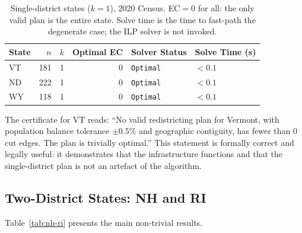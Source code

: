 \begin{table}[t]
\centering
\caption{%
  Single-district states ($k=1$), 2020 Census.
  EC$= 0$ for all: the only valid plan is the entire state.
  Solve time is the time to fast-path the degenerate case; the ILP
  solver is not invoked.
}
\label{tab:trivial}
\renewcommand{\arraystretch}{1.3}
\begin{tabular}{@{}lrrrll@{}}
\toprule
State & $n$ & $k$ & Optimal EC & Solver Status & Solve Time (s) \\
\midrule
VT & 181 & 1 & 0 & \texttt{Optimal} & $< 0.1$ \\
ND & 222 & 1 & 0 & \texttt{Optimal} & $< 0.1$ \\
WY & 118 & 1 & 0 & \texttt{Optimal} & $< 0.1$ \\
\bottomrule
\end{tabular}
\end{table}

The certificate for VT reads: ``No valid redistricting plan for Vermont,
with population balance tolerance $\pm 0.5\%$ and geographic contiguity,
has fewer than 0 cut edges.  The plan is trivially optimal.''
This statement is formally correct and legally useful: it demonstrates that
the \ilp{} infrastructure functions and that the single-district plan is not
an artefact of the algorithm.

\subsection{Two-District States: NH and RI}

Table~\ref{tab:nh-ri} presents the main non-trivial results.

